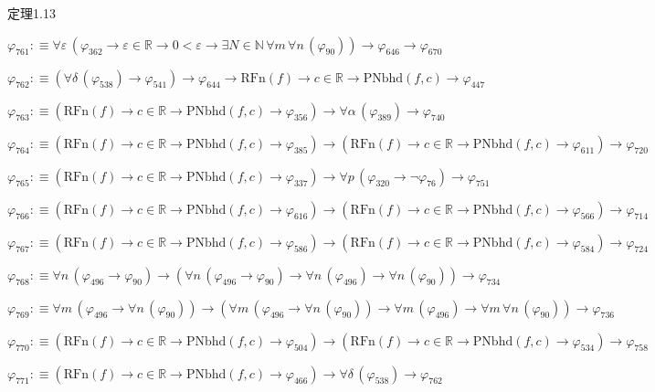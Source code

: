 \begin{fullproof}{定理1.13}
\begin{abbrevlist}
\item $\varphi_{761} :\equiv \forall \varepsilon\,(\varphi_{362} \to \varepsilon \in \mathbb{R} \to 0 < \varepsilon \to \exists N \in \mathbb{N}\,\forall m\,\forall n\,(\varphi_{90})) \to \varphi_{646} \to \varphi_{670}$
\item $\varphi_{762} :\equiv (\forall \delta\,(\varphi_{538}) \to \varphi_{541}) \to \varphi_{644} \to \mathrm{RFn}(f) \to c \in \mathbb{R} \to \mathrm{PNbhd}(f,c) \to \varphi_{447}$
\item $\varphi_{763} :\equiv (\mathrm{RFn}(f) \to c \in \mathbb{R} \to \mathrm{PNbhd}(f,c) \to \varphi_{356}) \to \forall \alpha\,(\varphi_{389}) \to \varphi_{740}$
\item $\varphi_{764} :\equiv (\mathrm{RFn}(f) \to c \in \mathbb{R} \to \mathrm{PNbhd}(f,c) \to \varphi_{385}) \to (\mathrm{RFn}(f) \to c \in \mathbb{R} \to \mathrm{PNbhd}(f,c) \to \varphi_{611}) \to \varphi_{720}$
\item $\varphi_{765} :\equiv (\mathrm{RFn}(f) \to c \in \mathbb{R} \to \mathrm{PNbhd}(f,c) \to \varphi_{337}) \to \forall p\,(\varphi_{320} \to \neg \varphi_{76}) \to \varphi_{751}$
\item $\varphi_{766} :\equiv (\mathrm{RFn}(f) \to c \in \mathbb{R} \to \mathrm{PNbhd}(f,c) \to \varphi_{616}) \to (\mathrm{RFn}(f) \to c \in \mathbb{R} \to \mathrm{PNbhd}(f,c) \to \varphi_{566}) \to \varphi_{714}$
\item $\varphi_{767} :\equiv (\mathrm{RFn}(f) \to c \in \mathbb{R} \to \mathrm{PNbhd}(f,c) \to \varphi_{586}) \to (\mathrm{RFn}(f) \to c \in \mathbb{R} \to \mathrm{PNbhd}(f,c) \to \varphi_{584}) \to \varphi_{724}$
\item $\varphi_{768} :\equiv \forall n\,(\varphi_{496} \to \varphi_{90}) \to (\forall n\,(\varphi_{496} \to \varphi_{90}) \to \forall n\,(\varphi_{496}) \to \forall n\,(\varphi_{90})) \to \varphi_{734}$
\item $\varphi_{769} :\equiv \forall m\,(\varphi_{496} \to \forall n\,(\varphi_{90})) \to (\forall m\,(\varphi_{496} \to \forall n\,(\varphi_{90})) \to \forall m\,(\varphi_{496}) \to \forall m\,\forall n\,(\varphi_{90})) \to \varphi_{736}$
\item $\varphi_{770} :\equiv (\mathrm{RFn}(f) \to c \in \mathbb{R} \to \mathrm{PNbhd}(f,c) \to \varphi_{504}) \to (\mathrm{RFn}(f) \to c \in \mathbb{R} \to \mathrm{PNbhd}(f,c) \to \varphi_{534}) \to \varphi_{758}$
\item $\varphi_{771} :\equiv (\mathrm{RFn}(f) \to c \in \mathbb{R} \to \mathrm{PNbhd}(f,c) \to \varphi_{466}) \to \forall \delta\,(\varphi_{538}) \to \varphi_{762}$

\end{abbrevlist}
\end{fullproof}
